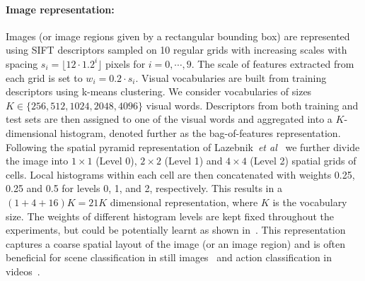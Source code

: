 \documentclass{bmvc2k}
\def\etal{\emph{et al}\bmvaOneDot}
\newcommand{\green}[1]{#1} %
\newcommand{\parnspc}{\vspace*{-4.2mm}}     %
\begin{document}
\paragraph{Image representation:}
Images (or image regions given by a rectangular bounding box) are represented using SIFT descriptors sampled on \green{10 regular grids with increasing scales with spacing $s_i = \lfloor12 \cdot 1.2^i\rfloor$ pixels for $i = 0, \cdots, 9$. The scale of features extracted from each grid is set to $w_i = 0.2 \cdot s_i$.}
 Visual vocabularies are built from training descriptors  using k-means clustering. We consider vocabularies of sizes $K\in\{256, 512, 1024, 2048, 4096\}$ visual words. Descriptors from both training and test sets are then assigned to one of the visual words
 and aggregated into a $K$-dimensional histogram, denoted further as the bag-of-features representation.
  Following the spatial pyramid representation of Lazebnik~\etal~\cite{Lazebnik06} we further divide the image into  $1\times1$ (Level 0), $2\times2$ (Level 1) and $4\times4$ (Level 2)  spatial grids of cells. Local histograms within  each cell are then concatenated with weights 0.25, 0.25 and 0.5 for levels 0, 1, and 2, respectively. This results in a $(1 + 4 + 16)K=21K$ dimensional representation, where $K$ is the vocabulary size. The weights of different histogram levels are kept fixed throughout the experiments, but could be potentially learnt as shown in~\cite{Bosch07}. This representation captures a coarse spatial layout of the image (or an image region) and is often beneficial for scene classification in still images~\cite{Lazebnik06} and action classification in videos~\cite{Laptev08}.

\parnspc
\end{document}
